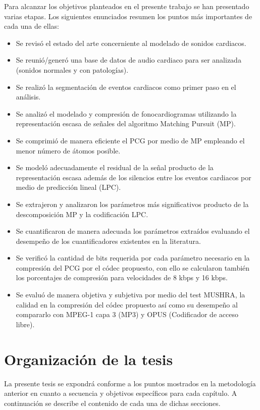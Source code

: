 Para alcanzar los objetivos planteados en el presente trabajo se han presentado varias etapas. Los siguientes enunciados resumen los puntos más importantes de cada una de ellas: 
\begin{itemize}
	\item Se revisó el estado del arte concerniente al modelado de sonidos cardiacos.
	\item Se reunió/generó una base de datos de audio cardiaco para ser analizada (sonidos normales y con patologías).
	\item Se realizó la segmentación de eventos cardiacos como primer paso en el análisis. 
	\item Se analizó el modelado y compresión de fonocardiogramas utilizando la representación escasa de señales del 				algoritmo Matching Pursuit (MP).  
	\item Se comprimió de manera eficiente el PCG por medio de MP empleando el menor número de átomos posible.
	\item Se modeló adecuadamente el residual de la señal producto de la representación escasa además de los silencios 		entre los eventos cardiacos por medio de predicción lineal (LPC).
	\item Se extrajeron y analizaron los parámetros más significativos producto de la descomposición MP y la codificación LPC.
	\item Se cuantificaron de manera adecuada los parámetros extraídos evaluando el desempeño de los cuantificadores 			existentes en la literatura.	
	\item Se verificó la cantidad de bits requerida por cada parámetro necesario en la compresión del PCG por el códec propuesto, con ello se calcularon también los porcentajes de compresión para velocidades de 8 kbps y 16 kbps.
	
	\item Se evaluó de manera objetiva y subjetiva por medio del test MUSHRA, la calidad en la compresión del códec propuesto así como su desempeño 		al compararlo con MPEG-1 capa 3 (MP3) y OPUS (Codificador de acceso libre).
\end{itemize}

\section{Organización de la tesis}
 La presente tesis se expondrá conforme a los puntos mostrados en la metodología anterior en cuanto a secuencia y objetivos específicos para cada capítulo. A continuación se describe el contenido de cada una de dichas secciones.
  
